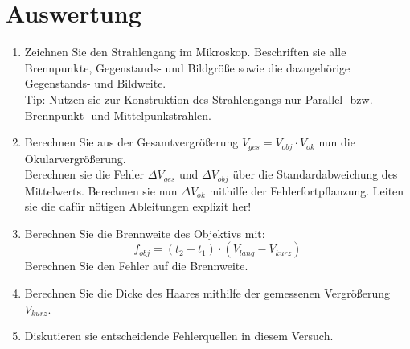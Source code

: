 \section{Auswertung} 
\begin{enumerate}
%
\item Zeichnen Sie den Strahlengang im Mikroskop. Beschriften sie alle Brennpunkte, Gegenstands- und Bildgröße sowie die dazugehörige Gegenstands- und Bildweite.\\
Tip: Nutzen sie zur Konstruktion des Strahlengangs nur Parallel- bzw. Brennpunkt- und Mittelpunkstrahlen.
%
\item Berechnen Sie aus der Gesamtvergrößerung $V_{ges} = V_{obj}\cdot V_{ok}$ nun die Okularvergrößerung.\\
Berechnen sie die Fehler $\Delta V_{ges}$ und $\Delta V_{obj}$ über die Standardabweichung des Mittelwerts. Berechnen sie nun $\Delta V_{ok}$ mithilfe der Fehlerfortpflanzung. Leiten sie die dafür nötigen Ableitungen explizit her!
%
\item Berechnen Sie die Brennweite des Objektivs mit:
\begin{equation*}
f_{obj} = \left(t_2-t_1\right)\cdot\left(V_{lang}- V_{kurz}\right)
\end{equation*}
Berechnen Sie den Fehler auf die Brennweite.
%
\item Berechnen Sie die Dicke des Haares mithilfe der gemessenen Vergrößerung $V_{kurz}$.
%
\item Diskutieren sie entscheidende Fehlerquellen in diesem Versuch.
%
\end{enumerate}